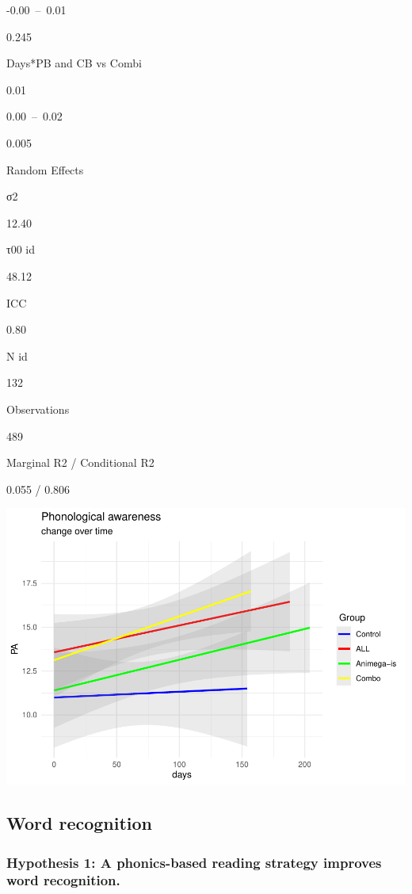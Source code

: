 \documentclass[
  ,
]{article}
\begin{document}
-0.00~--~0.01

0.245

Days*PB and CB vs Combi

0.01

0.00~--~0.02

0.005

Random Effects

σ2

12.40

τ00 id

48.12

ICC

0.80

N id

132

Observations

489

Marginal R2 / Conditional R2

0.055 / 0.806

\includegraphics{Effects_of_training_files/figure-latex/PA-plot-1.pdf}

\hypertarget{word-recognition-1}{%
\subsection{Word recognition}\label{word-recognition-1}}

\hypertarget{hypothesis-1-a-phonics-based-reading-strategy-improves-word-recognition.}{%
\subsubsection{Hypothesis 1: A phonics-based reading strategy improves
word
recognition.}\label{hypothesis-1-a-phonics-based-reading-strategy-improves-word-recognition.}}
\end{document}
